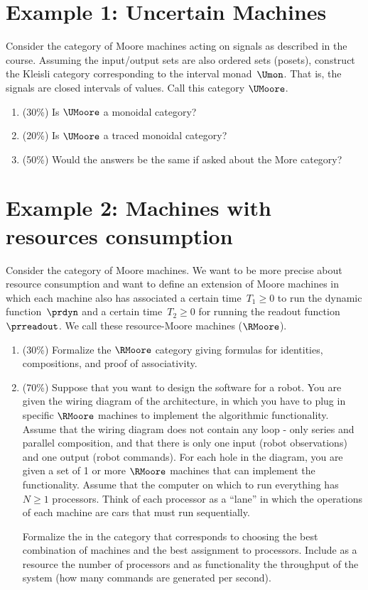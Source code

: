 \section{Example 1: Uncertain Machines}

Consider the category of Moore machines acting on signals as described in the course.
Assuming the input/output sets are also ordered sets (posets), construct the Kleisli category corresponding to the interval monad~$\Umon$.
That is, the signals are closed intervals of values.
Call this category $\UMoore$.
\begin{enumerate}
    \item (30\%) Is $\UMoore$ a monoidal category?
    \item (20\%) Is $\UMoore$ a traced monoidal category?
    \item (50\%) Would the answers be the same if asked about the More category?
\end{enumerate}

\section{Example 2: Machines with resources consumption}
Consider the category of Moore machines.
We want to be more precise about resource consumption and want to define an extension of Moore machines in which each machine also has associated a certain time~$T_1\geq 0$ to run the dynamic function~$\prdyn$ and a certain time~$T_2\geq 0$ for running the readout function~$\prreadout$.
We call these resource-Moore machines ($\RMoore$).

\begin{enumerate}
    \item (30\%) Formalize the $\RMoore$ category giving formulas for identities, compositions, and proof of associativity.
    \item (70\%) Suppose that you want to design the software for a robot.
          You are given the wiring diagram of the architecture, in which you have to plug in specific $\RMoore$ machines to implement the algorithmic functionality.
          Assume that the wiring diagram does not contain any loop - only series and parallel composition, and that there is only one input (robot observations) and one output (robot commands).
          For each hole in the diagram, you are given a set of 1 or more $\RMoore$ machines that can implement the functionality.
          Assume that the computer on which to run everything has~$N\geq 1$ processors.
          Think of each processor as a ``lane'' in which the operations of each machine are cars that must run sequentially.

          Formalize the  in the category \DPI that corresponds to choosing the best combination of machines and the best assignment to processors.
          Include as a resource the number of processors and as functionality the throughput of the system (how many commands are generated per second).
\end{enumerate}

